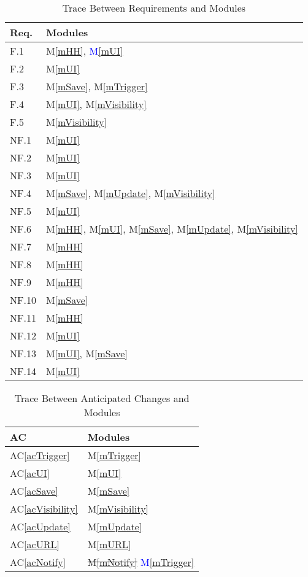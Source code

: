 \documentclass[12pt, titlepage]{article}
\newcommand{\acref}[1]{AC\ref{#1}}
\newcommand{\mref}[1]{M\ref{#1}}
\begin{document}
\begin{table}[H]
\centering
\begin{tabular}{p{} p{}}
\toprule
\textbf{Req.} & \textbf{Modules}\\
\midrule
F.1 & \mref{mHH}, \textcolor{blue}{\mref{mUI}}\\
F.2 & \mref{mUI}\\
F.3 & \mref{mSave}, \mref{mTrigger}\\
F.4 & \mref{mUI}, \mref{mVisibility}\\
F.5 & \mref{mVisibility}\\
NF.1 & \mref{mUI}\\
NF.2 & \mref{mUI}\\
NF.3 & \mref{mUI}\\
NF.4 & \mref{mSave}, \mref{mUpdate}, \mref{mVisibility}\\
NF.5 & \mref{mUI}\\
NF.6 & \mref{mHH}, \mref{mUI}, \mref{mSave}, \mref{mUpdate}, 
\mref{mVisibility}\\
NF.7 & \mref{mHH}\\
NF.8 & \mref{mHH}\\
NF.9 & \mref{mHH}\\
NF.10 & \mref{mSave}\\
NF.11 & \mref{mHH}\\
NF.12 & \mref{mUI}\\
NF.13 & \mref{mUI}, \mref{mSave}\\
NF.14 & \mref{mUI}\\
\bottomrule
\end{tabular}
\caption{Trace Between Requirements and Modules}
\label{TblRT}
\end{table}

\begin{table}[H]
\centering
\begin{tabular}{p{} p{}}
\toprule
\textbf{AC} & \textbf{Modules}\\
\midrule
\acref{acTrigger} & \mref{mTrigger}\\
\acref{acUI} & \mref{mUI}\\
\acref{acSave} & \mref{mSave}\\
\acref{acVisibility} & \mref{mVisibility}\\
\acref{acUpdate} & \mref{mUpdate}\\
\acref{acURL} & \mref{mURL}\\
\acref{acNotify} & \sout{\mref{mNotify}} \textcolor{blue}{\mref{mTrigger}}\\
\bottomrule
\end{tabular}
\caption{Trace Between Anticipated Changes and Modules}
\label{TblACT}
\end{table}
\end{document}
